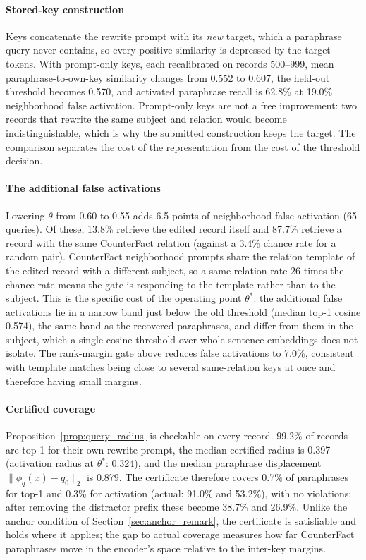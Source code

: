 \documentclass[preprint,12pt]{elsarticle}
\newcommand{\rev}[1]{#1}
\begin{document}
\paragraph{Stored-key construction}
\rev{Keys concatenate the rewrite prompt with its \emph{new} target, which a paraphrase query never contains, so every positive similarity is depressed by the target tokens. With prompt-only keys, each recalibrated on records 500--999, mean paraphrase-to-own-key similarity changes from 0.552 to 0.607, the held-out threshold becomes 0.570, and activated paraphrase recall is 62.8\% at 19.0\% neighborhood false activation. Prompt-only keys are not a free improvement: two records that rewrite the same subject and relation would become indistinguishable, which is why the submitted construction keeps the target. The comparison separates the cost of the representation from the cost of the threshold decision.}

\paragraph{The additional false activations}
\rev{Lowering $\theta$ from 0.60 to 0.55 adds 6.5 points of neighborhood false activation (65 queries). Of these, 13.8\% retrieve the edited record itself and 87.7\% retrieve a record with the same CounterFact relation (against a 3.4\% chance rate for a random pair). CounterFact neighborhood prompts share the relation template of the edited record with a different subject, so a same-relation rate 26 times the chance rate means the gate is responding to the template rather than to the subject. This is the specific cost of the operating point $\theta^*$: the additional false activations lie in a narrow band just below the old threshold (median top-1 cosine 0.574), the same band as the recovered paraphrases, and differ from them in the subject, which a single cosine threshold over whole-sentence embeddings does not isolate. The rank-margin gate above reduces false activations to 7.0\%, consistent with template matches being close to several same-relation keys at once and therefore having small margins.}

\paragraph{Certified coverage}
\rev{Proposition~\ref{prop:query_radius} is checkable on every record. 99.2\% of records are top-1 for their own rewrite prompt, the median certified radius is 0.397 (activation radius at $\theta^*$: 0.324), and the median paraphrase displacement $\|\phi_q(x)-q_0\|_2$ is 0.879. The certificate therefore covers 0.7\% of paraphrases for top-1 and 0.3\% for activation (actual: 91.0\% and 53.2\%), with no violations; after removing the distractor prefix these become 38.7\% and 26.9\%. Unlike the anchor condition of Section~\ref{sec:anchor_remark}, the certificate is satisfiable and holds where it applies; the gap to actual coverage measures how far CounterFact paraphrases move in the encoder's space relative to the inter-key margins.}
\end{document}
